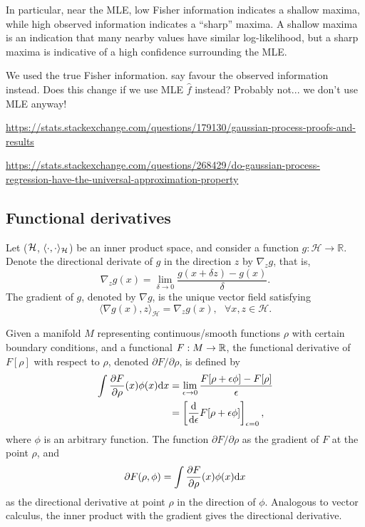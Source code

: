 In particular, near the MLE, low Fisher information indicates a shallow maxima, while high observed information indicates a ``sharp'' maxima.
A shallow maxima is an indication that many nearby values have similar log-likelihood, but a sharp maxima is indicative of a high confidence surrounding the MLE.

We used the true Fisher information. \citet{efron1978assessing} say favour the observed information instead. Does this change if we use MLE $\hat f$ instead? Probably not... we don't use MLE anyway!

\url{https://stats.stackexchange.com/questions/179130/gaussian-process-proofs-and-results}

\url{https://stats.stackexchange.com/questions/268429/do-gaussian-process-regression-have-the-universal-approximation-property}

\subsection{Functional derivatives}

\begin{definition}
  Let (${\mathcal H}$, $\langle\cdot,\cdot\rangle_{\mathcal H}$) be an inner product space, and consider a function $g:\mathcal H \rightarrow \mathbb R$. 
  Denote the directional derivate of $g$ in the direction $z$ by $\nabla_z g$, that is, 
	\[
		\nabla_z g(x) = \lim_{\delta \rightarrow 0} \frac{g(x + \delta z) - g(x)}{\delta}.
	\]
	The gradient of $g$, denoted by $\nabla g$, is the unique vector field satisfying 
	\[
		\langle \nabla g(x), z \rangle_{\mathcal H} = \nabla_z g(x), \ \ \ \forall x,z \in \mathcal H.
	\]
\end{definition}

\begin{definition}
  Given a manifold $M$ representing continuous/smooth functions $\rho$ with certain boundary conditions, and a functional $F:M\to\mathbb{R}$, the functional derivative of $F[\rho]$ with respect to $\rho$, denoted $\partial F/\partial\rho$, is defined by
  \begin{align*}
    \int \frac{\partial F}{\partial\rho}(x)\phi(x)\text{d} x
    &= \lim_{\epsilon\to 0} \frac{F[\rho + \epsilon\phi] - F[\rho]}{\epsilon} \\
    &= \left[ \frac{\text{d}}{\text{d} \epsilon} F[\rho + \epsilon\phi] \right]_{\epsilon=0},
  \end{align*}
  where $\phi$ is an arbitrary function.
  The function $\partial F/\partial\rho$ as the gradient of $F$ at the point $\rho$, and
  \[
    \partial F(\rho,\phi) = \int \frac{\partial F}{\partial\rho}(x)\phi(x) \text{d} x
  \]
  as the directional derivative at point $\rho$ in the direction of $\phi$.
  Analogous to vector calculus, the inner product with the gradient gives the directional derivative.
\end{definition}

